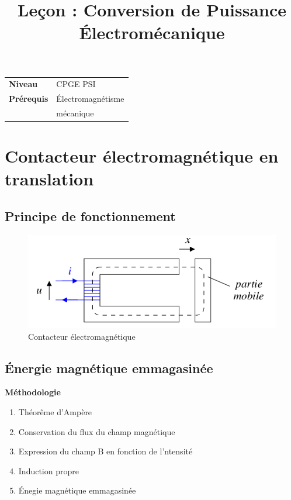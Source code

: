 \documentclass[10pt]{beamer}
\title{Leçon : Conversion de Puissance Électromécanique}
\begin{document}
\begin{frame}{}
    \titlepage

    \begin{tabularx}{\textwidth}{l@{:\,\,}X}
        \textbf{Niveau} 	  & CPGE PSI\\
        \textbf{Prérequis} & Électromagnétisme \\
        & mécanique
    \end{tabularx}
\end{frame}

\begin{frame}
    \tableofcontents
\end{frame}

\section{Contacteur électromagnétique en translation}

\subsection{Principe de fonctionnement}

\begin{frame}{\insertsubsection}
    \begin{figure}
        \centering
        \includegraphics[width=1\textwidth]{ContacteurElectromagnetique.png}
        \caption{Contacteur électromagnétique}
    \end{figure}
\end{frame}

\subsection{Énergie magnétique emmagasinée}

\begin{frame}{\insertsubsection}
\textbf{Méthodologie}
\begin{enumerate}
    \item Théorême d'Ampère
    \item Conservation du flux du champ magnétique
    \item Expression du champ B  en fonction de l'ntensité
    \item Induction propre
    \item Énegie magnétique emmagasinée
\end{enumerate}
\end{frame}
\end{document}
